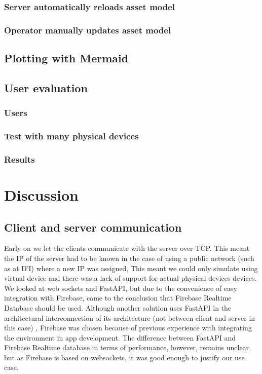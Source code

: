 \documentclass{article}
\begin{document}
\subsubsection{Server automatically reloads asset model}
\subsubsection{Operator manually updates asset model}
\subsection{Plotting with Mermaid}
\subsection{User evaluation}
\subsubsection{Users}
\subsubsection{Test with many physical devices}
\subsubsection{Results}




\newpage
\section{Discussion}\label{sec:Discussion}
\subsection{Client and server communication}\label{subsec:ClientServerCommunication}
Early on we let the clients communicate with the server over TCP. This meant the IP of the server had to be known in the case of using a public network (such as at IFI) where a new IP was assigned, This meant we could only simulate using virtual device and there was a lack of support for actual physical devices devices. We looked at web sockets and FastAPI, but due to the convenience of easy integration with Firebase, came to the conclusion that Firebase Realtime Database should be used. Although another solution uses FastAPI in the architectural interconnection of its architecture (not between client and server in this case) \cite{waszak_let_2022}, Firebase was chosen because of previous experience with integrating the environment in app development. The difference between FastAPI and Firebase Realtime database in terms of performance, however, remains unclear, but as Firebase is based on websockets, it was good enough to justify our use case.
\end{document}
